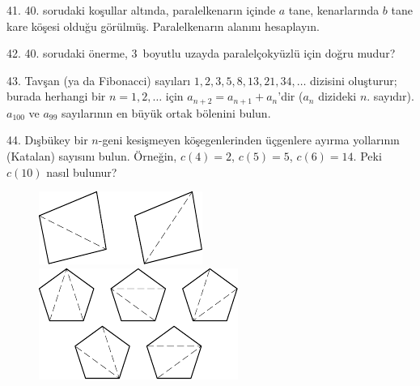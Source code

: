 \begin{problem}{41.}
	40. sorudaki koşullar altında, paralelkenarın içinde $a$ tane, ke\-nar\-la\-rın\-da $b$ tane kare köşesi  olduğu görülmüş. Paralelkenarın alanını hesaplayın.
\end{problem}

\begin{problem}{42.}
40. sorudaki önerme, 3~boyutlu uzayda paralelçokyüzlü için doğru mudur?
\end{problem}

\begin{problem}{43.}
	Tavşan (ya da Fibonacci) sayıları $1,2,3,5,8,\allowbreak 13,21,34,\dotsc$ dizisini oluşturur; burada herhangi bir $n=1,2,\dotsc$ için $a_{n+2}=a_{n+1}+a_{n}$'dir ($a_n$ dizideki $n$. sayıdır). $a_{100}$ ve $a_{99}$ sayılarının en büyük ortak bölenini bulun.
\end{problem}

\begin{problem}{44.}
	Dışbükey bir $n$-geni kesişmeyen köşegenlerinden üçgenlere ayırma yollarının (Katalan) sayısını bulun. Örneğin, $c(4)=2$, $c(5)=5$, $c(6)=14$. Peki $c(10)$ nasıl bulunur?
	\begin{figure}
		\includegraphics{resources/taskbook-281}
		\qquad
		\includegraphics{resources/taskbook-282}
	\end{figure}
\end{problem}

